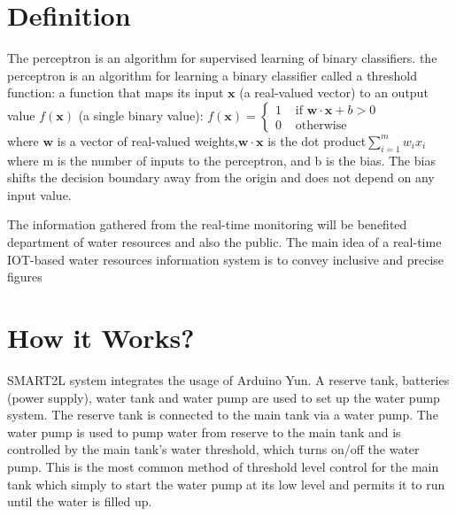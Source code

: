 \documentclass[12pt,times,a4paper]{report}
\begin{document}
{{\begin{normalsize}
\section{Definition}
The perceptron is an algorithm for supervised learning of binary classifiers. the perceptron is an algorithm for learning a binary classifier called a threshold function: a function that maps its input $\mathbf {x}$  (a real-valued vector) to an output value $ f(\mathbf {x} )$ (a single binary value):
$f(\mathbf{x})=\left\{\begin{array}{ll}{1} & {\text { if } \mathbf{w} \cdot \mathbf{x}+b>0} \\ {0} & {\text { otherwise }}\end{array}\right.$\\
where $ \mathbf {w}$  is a vector of real-valued weights,$ {\displaystyle \mathbf {w} \cdot \mathbf {x} }$ is the dot product$ {\displaystyle \sum _{i=1}^{m}w_{i}x_{i}} $where m is the number of inputs to the perceptron, and b is the bias. The bias shifts the decision boundary away from the origin and does not depend on any input value.

\newpage
The information gathered from the real-time monitoring will be benefited department of water resources and also the public. The main idea of a real-time IOT-based water resources information system is to convey inclusive and precise figures
\begin{figure}
\begin{center}
\caption{}
\end{center}
\end{figure}
\pagebreak
\section{How it Works?}
\par
SMART2L system integrates the usage of Arduino Yun. A reserve tank, batteries (power supply), water tank and water pump are used to set up the water pump system. The reserve tank is connected to the main tank via a water pump. The water pump is used to pump water from reserve to the main tank and is controlled by the main tank’s water threshold, which turns on/off the water pump. This is the most common method of threshold level control for the main tank which simply to start the water pump at its low level and permits it to run until the water is filled up.


\end{normalsize}}}
\end{document}

